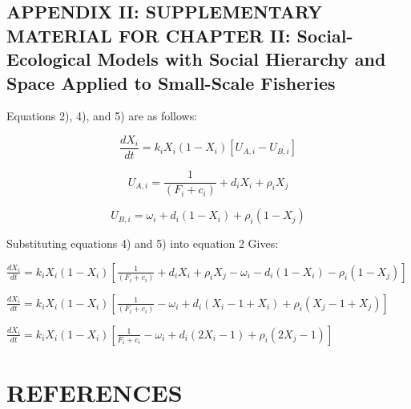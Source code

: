 \documentclass[
  12pt,
]{article}
\begin{document}
\newpage

\hypertarget{appendix-ii-supplementary-material-for-chapter-ii-social-ecological-models-with-social-hierarchy-and-space-applied-to-small-scale-fisheries}{%
\subsection{APPENDIX II: SUPPLEMENTARY MATERIAL FOR CHAPTER II: Social-Ecological Models with Social Hierarchy and Space Applied to Small-Scale Fisheries}\label{appendix-ii-supplementary-material-for-chapter-ii-social-ecological-models-with-social-hierarchy-and-space-applied-to-small-scale-fisheries}}

Equations 2), 4), and 5) are as follows:

\begin{equation}
\tag{2}
\frac{dX_i}{dt} = k_iX_i(1-X_i)[U_{A,i} - U_{B,i}]
\end{equation}

\begin{equation}
\tag{4}
U_{A,i} = \frac{1}{(F_i + c_i)} + d_iX_i + \rho_i X_j
\end{equation}

\begin{equation}
\tag{5}
U_{B,i} = \omega_i + d_i(1-X_i) + \rho_i(1-X_j)
\end{equation}

Substituting equations 4) and 5) into equation 2 Gives:

\(\frac{dX_i}{dt} = k_iX_i(1-X_i)[\frac{1}{(F_i + c_i)} + d_iX_i + \rho_i X_j - \omega_i - d_i(1-X_i) - \rho_i(1-X_j)]\)

\(\frac{dX_i}{dt} = k_iX_i(1-X_i)[\frac{1}{(F_i + c_i)} - \omega_i + d_i(X_i-1+X_i) + \rho_i(X_j-1+X_j)]\)

\(\frac{dX_i}{dt} = k_iX_i(1-X_i) [\frac{1}{F_i+c_i} - \omega_i + d_i(2X_i - 1) + \rho_i(2X_j - 1)]\)

\newpage

\hypertarget{references}{%
\section{REFERENCES}\label{references}}

\singlespacing
\end{document}

